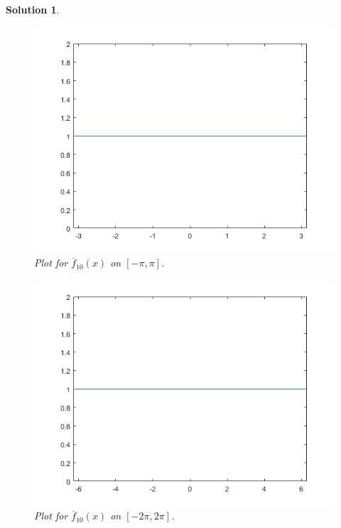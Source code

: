\documentclass[leqno]{article}
\theoremstyle{nonumberplain}
\newtheorem{solution}{Solution}
\begin{document}
\begin{solution}
\begin{figure}[h]
    \centering
    \includegraphics{problem_3_3_hw_5.png}
    \caption{Plot for $\overline{f}_{10}(x)$ on $[-\pi,\pi]$.}
    \label{fig:my_label}
\end{figure}
\pagebreak

\begin{figure}[h]
    \centering
    \includegraphics{problem_3_4_hw_5.png}
    \caption{Plot for $\overline{f}_{10}(x)$ on $[-2\pi,2\pi]$.}
    \label{fig:my_label}
\end{figure}
\pagebreak


\end{solution}
\end{document}
